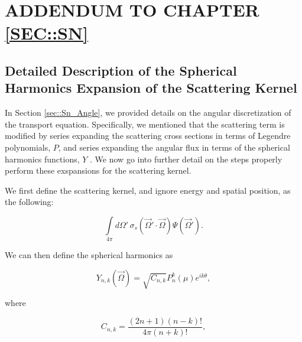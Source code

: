 %
%
%

\chapter{\uppercase{Addendum to Chapter \ref{sec::Sn}}}
\label{sec::appendix_SN}

\section{Detailed Description of the Spherical Harmonics Expansion of the Scattering Kernel}
\label{sec::appendix_SN_Scattering}

In Section \ref{sec::Sn_Angle}, we provided details on the angular discretization of the transport equation. Specifically, we mentioned that the scattering term is modified by series expanding the scattering cross sections in terms of Legendre polynomials, $P$, and series expanding the angular flux in terms of the spherical harmonics functions, $Y$ . We now go into further detail on the steps properly perform these exspansions for the scattering kernel.

We first define the scattering kernel, and ignore energy and spatial position, as the following:

\begin{equation}
\label{eq::App_SN_scatt_kernel}
\int\limits_{4 \pi} d \Omega' \, \sigma_s (\vec{\Omega}' \cdot \vec{\Omega}) \Psi (\vec{\Omega}') .
\end{equation}

\noindent We can then define the spherical harmonics as

\begin{equation}
\label{eq::App_SN_sph_harm_funcs}
Y_{n,k} (\vec{\Omega}) = \sqrt{C_{n,k}} P_n^k (\mu) e^{i k \theta} ,
\end{equation}

\noindent where

\begin{equation}
\label{eq::App_SN_sph_harm_consts}
C_{n,k} = \frac{(2n +1)(n-k)!}{4 \pi (n+k) !} ,
\end{equation}

